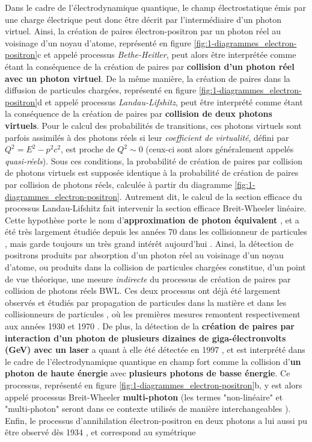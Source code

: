 \begin{refsection}
Dans le cadre de l'électrodynamique quantique, le champ électrostatique émis par une charge électrique peut donc être décrit par l'intermédiaire d'un photon virtuel. Ainsi, la création de paires électron-positron par un photon réel au voisinage d'un noyau d'atome, représenté en figure \ref{fig:1-diagrammes_electron-positron}c et appelé processus \textit{Bethe-Heitler}, peut alors être interprétée comme étant la conséquence de la création de paires par \textbf{collision d'un photon réel avec un photon virtuel}. De la même manière, la création de paires dans la diffusion de particules chargées, représenté en figure \ref{fig:1-diagrammes_electron-positron}d et appelé processus \textit{Landau-Lifshitz}, peut être interprété comme étant la conséquence de la création de paires par \textbf{collision de deux photons virtuels}. Pour le calcul des probabilités de transitions, ces photons virtuels sont parfois assimilés à des photons réels si leur \textit{coefficient de virtualité}, défini par $Q^2=E^2-p^2c^2$, est proche de $Q^2 \sim 0$ \parencite{greiner_2009} (ceux-ci sont alors généralement appelés \textit{quasi-réels}). Sous ces conditions, la probabilité de création de paires par collision de photons virtuels est supposée identique à la probabilité de création de paires par collision de photons réels, calculée à partir du diagramme \ref{fig:1-diagrammes_electron-positron}. Autrement dit, le calcul de la section efficace du processus Landau-Lifshitz fait intervenir la section efficace Breit-Wheeler linéaire. Cette hypothèse porte le nom d'\textbf{approximation de photon équivalent} \parencite{greiner_2009, kessler_1974}, et a été très largement étudiée depuis les années 70 dans les collisionneur de particules \parencite{budnev_1975}, mais garde toujours un très grand intérêt aujourd'hui \parencite{klein_2020, starcollaboration_2019}. Ainsi, la détection de positrons produits par absorption d'un photon réel au voisinage d'un noyau d'atome, ou produits dans la collision de particules chargées constitue, d'un point de vue théorique, une mesure \textit{indirecte} du processus de création de paires par collision de photons réels BWL. Ces deux processus ont déjà été largement observés et étudiés par propagation de particules dans la matière \parencite{hubbell_2006} et dans les collisionneurs de particules \parencite{budnev_1975}, où les premières mesures remontent respectivement aux années 1930 \parencite{anderson_1933} et 1970 \parencite{balakin_1971}. De plus, la détection de la \textbf{création de paires par interaction d'un photon de plusieurs dizaines de giga-électronvolts (GeV) avec un laser} a quant à elle été détectée en 1997 \parencite{burke_1997}, et est interprété dans le cadre de l'électrodynamique quantique en champ fort comme la collision d'\textbf{un photon de haute énergie} avec \textbf{plusieurs photons de basse énergie}. Ce processus, représenté en figure \ref{fig:1-diagrammes_electron-positron}b, y est alors appelé processus Breit-Wheeler \textbf{multi-photon} (les termes "non-linéaire" et "multi-photon" seront dans ce contexte utilisés de manière interchangeables \parencite{greiner_2009}). Enfin, le processus d'annihilation électron-positron en deux photons a lui aussi pu être observé dès 1934 \parencite{klemperer_1934}, et correspond au symétrique 
\end{refsection}
